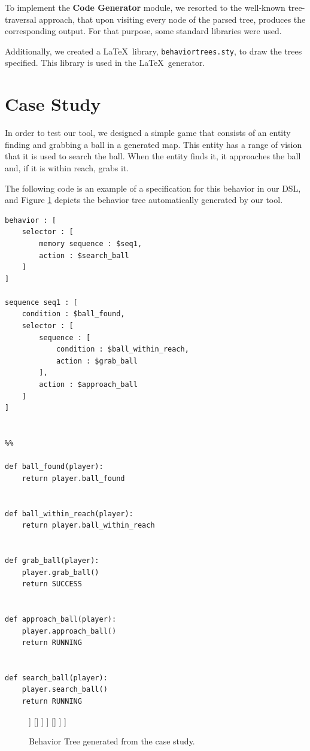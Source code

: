 \documentclass[a4paper,UKenglish,cleveref, autoref, thm-restate]{oasics-v2019}
\begin{document}
To implement the \textbf{Code Generator} module, we resorted to the well-known tree-traversal approach, that upon visiting every node of the parsed tree, produces the corresponding output.
For that purpose, some standard libraries were used.

Additionally, we created a \LaTeX\ library, \texttt{behaviortrees.sty}, to draw the trees specified.
This library is used in the \LaTeX\ generator.

\section{Case Study}
\label{sec:example}
In order to test our tool, we designed a simple game that consists of an entity finding and grabbing a ball in a generated map.
This entity has a range of vision that it is used to search the ball.
When the entity finds it, it approaches the ball and, if it is within reach, grabs it.

The following code is an example of a specification for this behavior in our DSL, and Figure \ref{fig:case_study_bt} depicts the behavior tree automatically generated by our tool.
\begin{lstlisting}
behavior : [
    selector : [
        memory sequence : $seq1,
        action : $search_ball
    ]
]

sequence seq1 : [
    condition : $ball_found,
    selector : [
        sequence : [
            condition : $ball_within_reach,
            action : $grab_ball
        ],
        action : $approach_ball
    ]
]


%%

def ball_found(player):
    return player.ball_found


def ball_within_reach(player):
    return player.ball_within_reach


def grab_ball(player):
    player.grab_ball()
    return SUCCESS


def approach_ball(player):
    player.approach_ball()
    return RUNNING


def search_ball(player):
    player.search_ball()
    return RUNNING
\end{lstlisting}

\begin{figure}
    \centering
    \begin{behavior}
        [\rootnode
            [\selector
                [\memorysequence
                    [\condition{ball found}]
                    [\selector
                        [\sequence
                            [\condition{ball within reach}]
                            [\action{grab ball}]
                        ]
                        []
                    ]
                ]
                []
            ]
        ]
    \end{behavior}
    \caption{Behavior Tree generated from the case study.}
    \label{fig:case_study_bt}
\end{figure}
\end{document}
